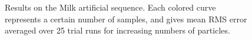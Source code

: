 \begin{figure}[!ht]
  \centering 
  \vspace{-10pt}
   \\
  \vspace{-10pt}
     \vspace{-7pt} \\
  \caption[Results on the Milk artificial sequence.]{Results on the Milk artificial sequence. Each colored curve represents a certain number of samples, and gives mean RMS error averaged over 25 trial runs for increasing numbers of particles.}%
  \label{fig:ErrorPlotsMilk}%
\end{figure}
